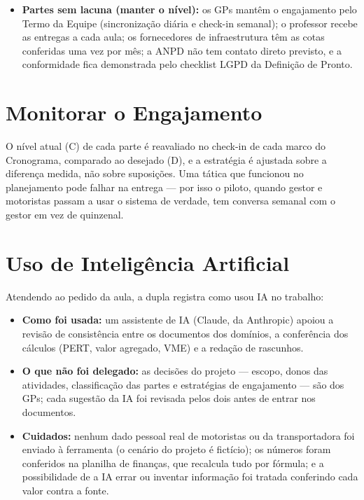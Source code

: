 \documentclass[11pt,a4paper]{article}
\begin{document}
\begin{itemize}[itemsep=5pt]
\begin{itemize}[label=--]
    \item \textbf{Responsável:} Kerlon.
    \item \textbf{Gatilho de reavaliação:} acesso à API não liberado até 04/09, fim de A2 (risco R01).
  \end{itemize}
  \item \textbf{Partes sem lacuna (manter o nível):} os GPs mantêm o engajamento pelo Termo da Equipe (sincronização diária e check-in semanal); o professor recebe as entregas a cada aula; os fornecedores de infraestrutura têm as cotas conferidas uma vez por mês; a ANPD não tem contato direto previsto, e a conformidade fica demonstrada pelo checklist LGPD da Definição de Pronto.
\end{itemize}

\section{Monitorar o Engajamento}
O nível atual (C) de cada parte é reavaliado no check-in de cada marco do Cronograma, comparado ao desejado (D), e a estratégia é ajustada sobre a diferença medida, não sobre suposições. Uma tática que funcionou no planejamento pode falhar na entrega --- por isso o piloto, quando gestor e motoristas passam a usar o sistema de verdade, tem conversa semanal com o gestor em vez de quinzenal.

\section{Uso de Inteligência Artificial}
Atendendo ao pedido da aula, a dupla registra como usou IA no trabalho:
\begin{itemize}[itemsep=2pt]
  \item \textbf{Como foi usada:} um assistente de IA (Claude, da Anthropic) apoiou a revisão de consistência entre os documentos dos domínios, a conferência dos cálculos (PERT, valor agregado, VME) e a redação de rascunhos.
  \item \textbf{O que não foi delegado:} as decisões do projeto --- escopo, donos das atividades, classificação das partes e estratégias de engajamento --- são dos GPs; cada sugestão da IA foi revisada pelos dois antes de entrar nos documentos.
  \item \textbf{Cuidados:} nenhum dado pessoal real de motoristas ou da transportadora foi enviado à ferramenta (o cenário do projeto é fictício); os números foram conferidos na planilha de finanças, que recalcula tudo por fórmula; e a possibilidade de a IA errar ou inventar informação foi tratada conferindo cada valor contra a fonte.
\end{itemize}
\end{document}
